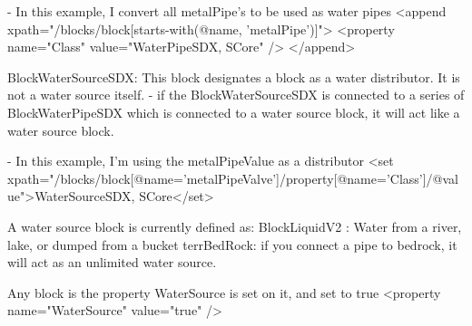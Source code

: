 \begin{DoxyVerb}
                - In this example, I convert all metalPipe's to be used as water pipes
                    <append xpath="/blocks/block[starts-with(@name, 'metalPipe')]">
                        <property name="Class" value="WaterPipeSDX, SCore" />
                    </append>

            BlockWaterSourceSDX: This block designates a block as a water distributor. It is not a water source itself.
                - if the BlockWaterSourceSDX is connected to a series of BlockWaterPipeSDX which is connected to a water source block, it will act like a water source block.

                - In this example, I'm using the metalPipeValue as a distributor
                    <set xpath="/blocks/block[@name='metalPipeValve']/property[@name='Class']/@value">WaterSourceSDX, SCore</set>


        A water source block is currently defined as:
            BlockLiquidV2 : Water from a river, lake, or dumped from a bucket
            terrBedRock: if you connect a pipe to bedrock, it will act as an unlimited water source.

            Any block is the property WaterSource is set on it, and set to true
                <property name="WaterSource" value="true" />
\end{DoxyVerb}
 